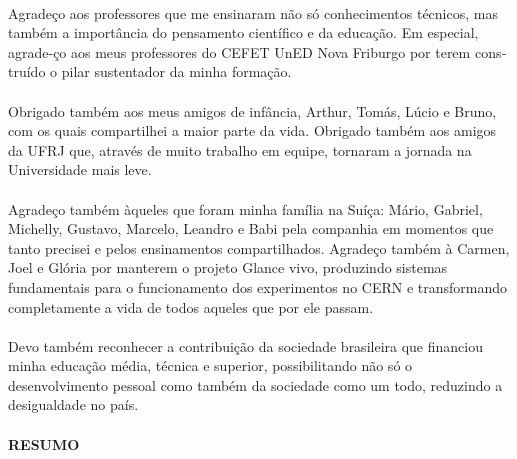 \begin{otherlanguage}{portuguese}
\paragraph{} Agradeço aos professores que me ensinaram não só conhecimentos técnicos, mas também a importância do pensamento científico e da educação. Em especial, agrade-ço aos meus professores do CEFET UnED Nova Friburgo por terem construído o pilar sustentador da minha formação.
\end{otherlanguage}


\paragraph{} Obrigado também aos meus amigos de infância, Arthur, Tomás, Lúcio e Bruno, com os quais compartilhei a maior parte da vida. Obrigado também aos amigos da UFRJ que, através de muito trabalho em equipe, tornaram a jornada na Universidade mais leve.

\paragraph{} Agradeço também àqueles que foram minha família na Suíça: Mário, Gabriel, Michelly, Gustavo, Marcelo, Leandro e Babi pela companhia em momentos que tanto precisei e pelos ensinamentos compartilhados. Agradeço também à Carmen, Joel e Glória por manterem o projeto Glance vivo, produzindo sistemas fundamentais para o funcionamento dos experimentos no CERN e transformando completamente a vida de todos aqueles que por ele passam.

\paragraph{} Devo também reconhecer a contribuição da sociedade brasileira que financiou minha educação média, técnica e superior, possibilitando não só o desenvolvimento pessoal como também da sociedade como um todo, reduzindo a desigualdade no país.

\paragraph{} 

\pagebreak


\begin{center}
\textbf{RESUMO}
\end{center}
      \vspace{0.5cm}

